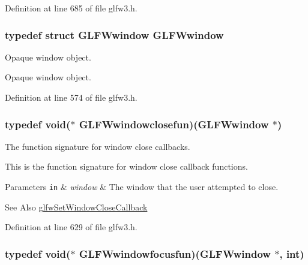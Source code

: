 Definition at line 685 of file glfw3.\-h.

\hypertarget{group__window_ga3c96d80d363e67d13a41b5d1821f3242}{
\subsubsection[{G\-L\-F\-Wwindow}]{\setlength{\rightskip}{0pt plus 5cm}typedef struct {\bf G\-L\-F\-Wwindow} {\bf G\-L\-F\-Wwindow}}}\label{group__window_ga3c96d80d363e67d13a41b5d1821f3242}


Opaque window object. 

Opaque window object. 

Definition at line 574 of file glfw3.\-h.

\hypertarget{group__window_ga07cff8bd3b3d573ecf49bb02d7669c1f}{
\subsubsection[{G\-L\-F\-Wwindowclosefun}]{\setlength{\rightskip}{0pt plus 5cm}typedef {\bf void}($\ast$  G\-L\-F\-Wwindowclosefun)({\bf G\-L\-F\-Wwindow} $\ast$)}}\label{group__window_ga07cff8bd3b3d573ecf49bb02d7669c1f}


The function signature for window close callbacks. 

This is the function signature for window close callback functions.


\begin{DoxyParams}[1]{Parameters}
\mbox{\tt in}  & {\em window} & The window that the user attempted to close.\\
\hline
\end{DoxyParams}
\begin{DoxySeeAlso}{See Also}
\hyperlink{group__window_ga5b827da350141c789acd64f5c4f7a0e1}{glfw\-Set\-Window\-Close\-Callback} 
\end{DoxySeeAlso}


Definition at line 629 of file glfw3.\-h.

\hypertarget{group__window_ga6b5f973531ea91663ad707ba4f2ac104}{
\subsubsection[{G\-L\-F\-Wwindowfocusfun}]{\setlength{\rightskip}{0pt plus 5cm}typedef {\bf void}($\ast$  G\-L\-F\-Wwindowfocusfun)({\bf G\-L\-F\-Wwindow} $\ast$, {\bf int})}}\label{group__window_ga6b5f973531ea91663ad707ba4f2ac104}


